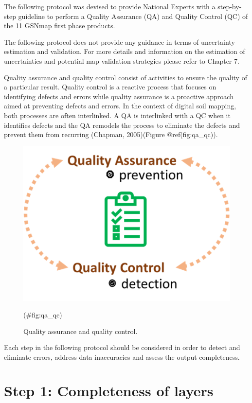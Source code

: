\documentclass[
  10pt,
  b5paper,
  oneside]{book}
\begin{document}
The following protocol was devised to provide National Experts with a step-by-step guideline to perform a Quality Assurance (QA) and Quality Control (QC) of the 11 GSNmap first phase products.

The following protocol does not provide any guidance in terms of uncertainty estimation and validation. For more details and information on the estimation of uncertainties and potential map validation strategies please refer to Chapter 7.

Quality assurance and quality control consist of activities to ensure the quality of a particular result. Quality control is a reactive process that focuses on identifying defects and errors while quality assurance is a proactive approach aimed at preventing defects and errors. In the context of digital soil mapping, both processes are often interlinked. A QA is interlinked with a QC when it identifies defects and the QA remodels the process to eliminate the defects and prevent them from recurring (Chapman, 2005)(Figure @ref(fig:qa\_qc)).

\begin{figure}
\includegraphics[width=6.43in]{images/QA_QC} \caption{Quality assurance and quality control.}(\#fig:qa_qc)
\end{figure}

Each step in the following protocol should be considered in order to detect and eliminate errors, address data inaccuracies and assess the output completeness.

\hypertarget{step-1-completeness-of-layers}{%
\section*{Step 1: Completeness of layers}\label{step-1-completeness-of-layers}}
\end{document}
